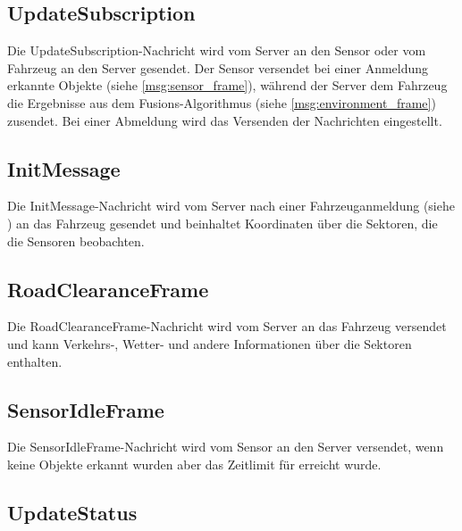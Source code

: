 \subsection{UpdateSubscription}

Die UpdateSubscription-Nachricht wird vom Server an den Sensor oder vom Fahrzeug an den Server gesendet.
Der Sensor versendet bei einer Anmeldung erkannte Objekte (siehe \autoref{msg:sensor_frame}), während der Server dem Fahrzeug die Ergebnisse aus dem Fusions-Algorithmus (siehe \autoref{msg:environment_frame}) zusendet.
Bei einer Abmeldung wird das Versenden der Nachrichten eingestellt.

\subsection{InitMessage}

Die InitMessage-Nachricht wird vom Server nach einer Fahrzeuganmeldung (siehe ) an das Fahrzeug gesendet und beinhaltet Koordinaten über die Sektoren, die die Sensoren beobachten.

\subsection{RoadClearanceFrame}

Die RoadClearanceFrame-Nachricht wird vom Server an das Fahrzeug versendet und kann Verkehrs-, Wetter- und andere Informationen über die Sektoren enthalten.

\subsection{SensorIdleFrame}

Die SensorIdleFrame-Nachricht wird vom Sensor an den Server versendet, wenn keine Objekte erkannt wurden aber das Zeitlimit für  erreicht wurde.

\subsection{UpdateStatus}



